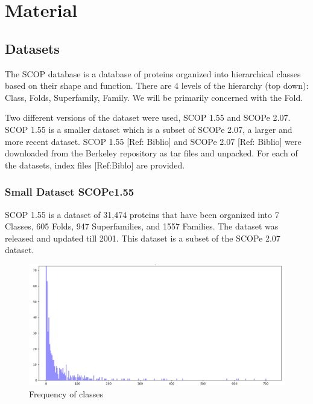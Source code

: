 \documentclass[12pt, a4paper, twocolumn, fullpage]{article}
\theoremstyle{plain}
\theoremstyle{definition}
\theoremstyle{remark}
\begin{document}
\section{Material}

\subsection{Datasets}

The SCOP database is a database of proteins organized into hierarchical classes based on their shape and function. There are 4 levels of the hierarchy (top down): Class, Folds, Superfamily, Family. We will be primarily concerned with the Fold.

Two different versions of the dataset were used, SCOP 1.55 and SCOPe 2.07. SCOP 1.55 is a smaller dataset which is a subset of SCOPe 2.07, a larger and more recent dataset. SCOP 1.55 [Ref: Biblio] and SCOPe 2.07 [Ref: Biblio] were downloaded from the Berkeley repository as tar files and unpacked. For each of the datasets, index files [Ref:Biblo] are provided.

\subsubsection{Small Dataset SCOPe1.55}

SCOP 1.55 is a dataset of 31,474 proteins that have been organized into 7 Classes, 605 Folds, 947 Superfamilies, and 1557 Families. The dataset was released and updated till 2001. This dataset is a subset of the SCOPe 2.07 dataset.

\begin{figure}
	\includegraphics[width=\linewidth]{num_proteins_fold_155}
	\caption{Frequency of classes}
	\label{fig:boat1}
\end{figure}
\end{document}
